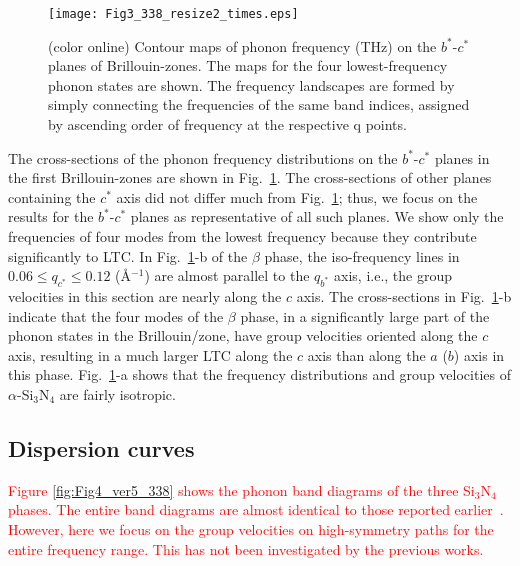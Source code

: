 \documentclass[twocolumn,amsmath,amssymb,a4paper,prb,superscriptaddress,floatfix]{revtex4-1}
\begin{document}
\begin{figure}[ht]
 \begin{center}
  \texttt{[image: Fig3\_338\_resize2\_times.eps]} \caption{(color
  online) Contour maps of phonon frequency (THz) on the $b^*$-$c^*$
  planes of Brillouin-zones. The maps for the four lowest-frequency
  phonon states are shown. The frequency landscapes are formed by simply
  connecting the frequencies of the same band indices, assigned by
  ascending order of frequency at the respective q
  points. \label{fig:Fig3_338} }
 \end{center}
\end{figure}

The cross-sections of the phonon frequency distributions on the
$b^*$-$c^*$ planes in the first Brillouin-zones are shown in
Fig.~\ref{fig:Fig3_338}. The cross-sections of other planes containing
the $c^*$ axis did not differ much from Fig.~\ref{fig:Fig3_338}; thus,
we focus on the results for the $b^*$-$c^*$ planes as representative of
all such planes. We show only the frequencies of four modes from the
lowest frequency because they contribute significantly to LTC. In
Fig.~\ref{fig:Fig3_338}-b of the $\beta$ phase, the iso-frequency lines
in $0.06 \le q_{c^*} \le 0.12$ (\AA$^{-1}$) are almost parallel to the
$q_{b^*}$ axis, i.e., the group velocities in this section are nearly
along the $c$ axis. The cross-sections in Fig.~\ref{fig:Fig3_338}-b
indicate that the four modes of the $\beta$ phase, in a significantly
large part of the phonon states in the Brillouin/zone, have group
velocities oriented along the $c$ axis, resulting in a much larger LTC
along the $c$ axis than along the $a$ ($b$) axis in this
phase. Fig.~\ref{fig:Fig3_338}-a shows that the frequency distributions
and group velocities of $\alpha$-Si$_3$N$_4$ are fairly isotropic.

\subsection{Dispersion curves}


\textcolor{red}{Figure \ref{fig:Fig4_ver5_338} shows the phonon band diagrams 
of the three Si$_3$N$_4$ phases.
The entire band diagrams are almost identical to those reported earlier~\cite{kuwabara,xu}.
However, here we focus on the group velocities on high-symmetry paths for the 
entire frequency range. This has not been investigated by the previous works. 
}
\end{document}
